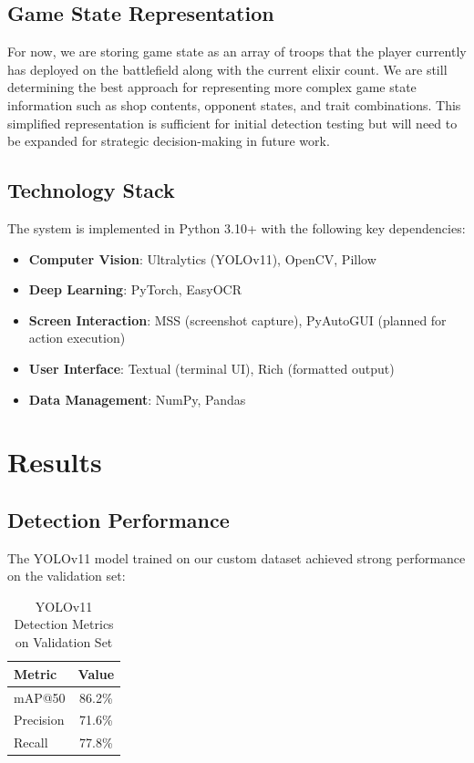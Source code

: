 \documentclass[12pt]{article}
\begin{document}
\subsection{Game State Representation}

For now, we are storing game state as an array of troops that the player currently has deployed on the battlefield along with the current elixir count. We are still determining the best approach for representing more complex game state information such as shop contents, opponent states, and trait combinations. This simplified representation is sufficient for initial detection testing but will need to be expanded for strategic decision-making in future work.

\subsection{Technology Stack}

The system is implemented in Python 3.10+ with the following key dependencies:

\begin{itemize}
    \item \textbf{Computer Vision}: Ultralytics (YOLOv11), OpenCV, Pillow
    \item \textbf{Deep Learning}: PyTorch, EasyOCR
    \item \textbf{Screen Interaction}: MSS (screenshot capture), PyAutoGUI (planned for action execution)
    \item \textbf{User Interface}: Textual (terminal UI), Rich (formatted output)
    \item \textbf{Data Management}: NumPy, Pandas
\end{itemize}

\section{Results}

\subsection{Detection Performance}

The YOLOv11 model trained on our custom dataset achieved strong performance on the validation set:

\begin{table}[H]
\centering
\caption{YOLOv11 Detection Metrics on Validation Set}
\begin{tabular}{@{}lc@{}}
\toprule
\textbf{Metric} & \textbf{Value} \\
\midrule
mAP@50 & 86.2\% \\
Precision & 71.6\% \\
Recall & 77.8\% \\
\bottomrule
\end{tabular}
\end{table}
\end{document}
